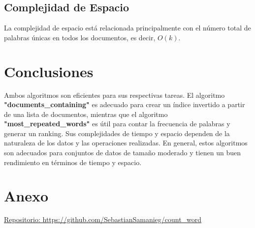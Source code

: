 \documentclass{article}
\begin{document}
\subsection{Complejidad de Espacio}
La complejidad de espacio está relacionada principalmente con el número total de palabras únicas en todos los documentos, es decir, $O(k)$.

\section{Conclusiones}
Ambos algoritmos son eficientes para sus respectivas tareas. El algoritmo \textbf{"documents\_containing"} es adecuado para crear un índice invertido a partir de una lista de documentos, mientras que el algoritmo \textbf{"most\_repeated\_words"} es útil para contar la frecuencia de palabras y generar un ranking. Sus complejidades de tiempo y espacio dependen de la naturaleza de los datos y las operaciones realizadas. En general, estos algoritmos son adecuados para conjuntos de datos de tamaño moderado y tienen un buen rendimiento en términos de tiempo y espacio.

\section{Anexo}
\href{https://github.com/SebastianSamanieg/count_word}{Repositorio: https://github.com/SebastianSamanieg/count\_word}
\end{document}
